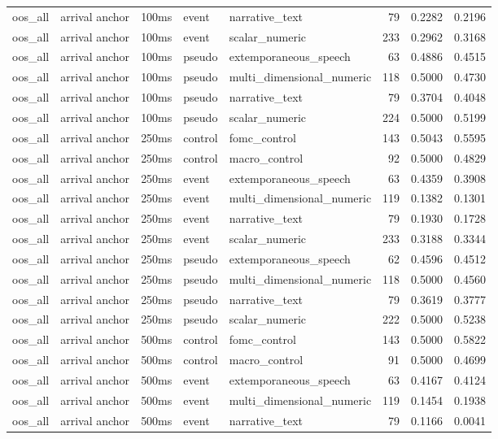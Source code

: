 \begin{tabular}{lllllrrr}
oos_all & arrival anchor & 100ms & event & narrative_text & 79 & 0.2282 & 0.2196 \\
oos_all & arrival anchor & 100ms & event & scalar_numeric & 233 & 0.2962 & 0.3168 \\
oos_all & arrival anchor & 100ms & pseudo & extemporaneous_speech & 63 & 0.4886 & 0.4515 \\
oos_all & arrival anchor & 100ms & pseudo & multi_dimensional_numeric & 118 & 0.5000 & 0.4730 \\
oos_all & arrival anchor & 100ms & pseudo & narrative_text & 79 & 0.3704 & 0.4048 \\
oos_all & arrival anchor & 100ms & pseudo & scalar_numeric & 224 & 0.5000 & 0.5199 \\
oos_all & arrival anchor & 250ms & control & fomc_control & 143 & 0.5043 & 0.5595 \\
oos_all & arrival anchor & 250ms & control & macro_control & 92 & 0.5000 & 0.4829 \\
oos_all & arrival anchor & 250ms & event & extemporaneous_speech & 63 & 0.4359 & 0.3908 \\
oos_all & arrival anchor & 250ms & event & multi_dimensional_numeric & 119 & 0.1382 & 0.1301 \\
oos_all & arrival anchor & 250ms & event & narrative_text & 79 & 0.1930 & 0.1728 \\
oos_all & arrival anchor & 250ms & event & scalar_numeric & 233 & 0.3188 & 0.3344 \\
oos_all & arrival anchor & 250ms & pseudo & extemporaneous_speech & 62 & 0.4596 & 0.4512 \\
oos_all & arrival anchor & 250ms & pseudo & multi_dimensional_numeric & 118 & 0.5000 & 0.4560 \\
oos_all & arrival anchor & 250ms & pseudo & narrative_text & 79 & 0.3619 & 0.3777 \\
oos_all & arrival anchor & 250ms & pseudo & scalar_numeric & 222 & 0.5000 & 0.5238 \\
oos_all & arrival anchor & 500ms & control & fomc_control & 143 & 0.5000 & 0.5822 \\
oos_all & arrival anchor & 500ms & control & macro_control & 91 & 0.5000 & 0.4699 \\
oos_all & arrival anchor & 500ms & event & extemporaneous_speech & 63 & 0.4167 & 0.4124 \\
oos_all & arrival anchor & 500ms & event & multi_dimensional_numeric & 119 & 0.1454 & 0.1938 \\
oos_all & arrival anchor & 500ms & event & narrative_text & 79 & 0.1166 & 0.0041 \\

\end{tabular}
